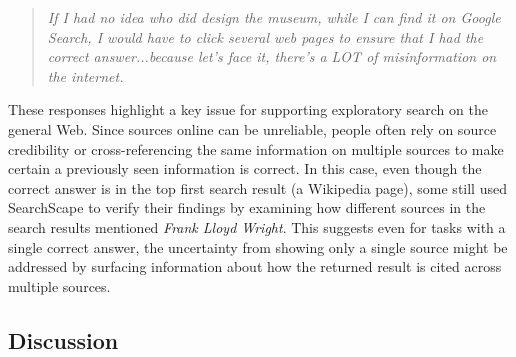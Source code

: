 \blockquote{\emph{If I had no idea who did design the museum, while I can find it on Google Search, I would have to click several web pages to ensure that I had the correct answer...because let's face it, there's a LOT of misinformation on the internet.}}


These responses highlight a key issue for supporting exploratory search on the general Web. Since sources online can be unreliable, people often rely on source credibility or cross-referencing the same information on multiple sources to make certain a previously seen information is correct.
In this case, even though the correct answer is in the top first search result (a Wikipedia page), some still used SearchScape to verify their findings by examining how different sources in the search results mentioned \emph{Frank Lloyd Wright}.
This suggests even for tasks with a single correct answer, the uncertainty from showing only a single source might be addressed by surfacing information about how the returned result is cited across multiple sources. 




\subsection{Discussion}

